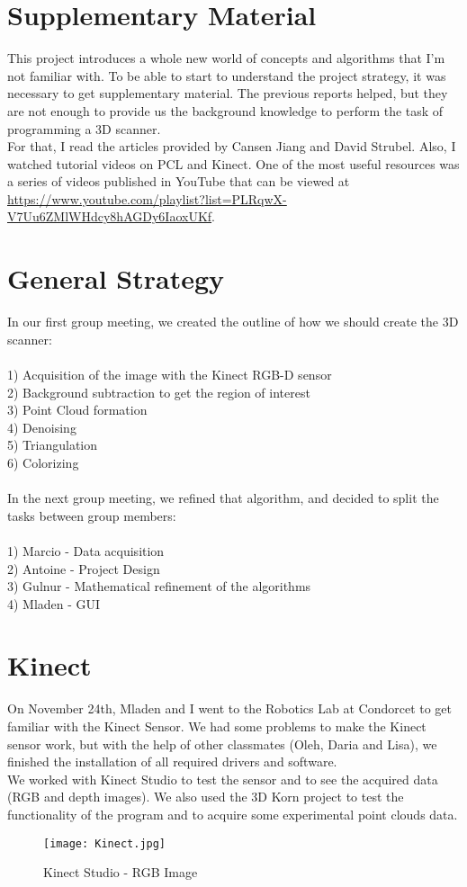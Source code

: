 \documentclass[aps,letterpaper,11pt]{revtex4}
\begin{document}
\section{Supplementary Material}
This project introduces a whole new world of concepts and algorithms that I'm not familiar with. To be able to start to understand the project strategy, it was necessary to get supplementary material. The previous reports helped, but they are not enough to provide us the background knowledge to perform the task of programming a 3D scanner.\\
\indent For that, I read the articles provided by Cansen Jiang and David Strubel. Also, I watched tutorial videos on PCL and Kinect. One of the most useful resources was a series of videos published in YouTube that can be viewed at \url{https://www.youtube.com/playlist?list=PLRqwX-V7Uu6ZMlWHdcy8hAGDy6IaoxUKf}.
\section{General Strategy}
In our first group meeting, we created the outline of how we should create the 3D scanner:\\
\\
1) Acquisition of the image with the Kinect RGB-D sensor\\
2) Background subtraction to get the region of interest\\
3) Point Cloud formation\\
4) Denoising\\
5) Triangulation\\
6) Colorizing\\
\\
\indent In the next group meeting, we refined that algorithm, and decided to split the tasks between group members:\\
\\
1) Marcio - Data acquisition\\
2) Antoine - Project Design\\
3) Gulnur - Mathematical refinement of the algorithms\\
4) Mladen - GUI\\
\section{Kinect}
On November 24th, Mladen and I went to the Robotics Lab at Condorcet to get familiar with the Kinect Sensor. We had some problems to make the Kinect sensor work, but with the help of other classmates (Oleh, Daria and Lisa), we finished the installation of all required drivers and software.\\
\indent We worked with Kinect Studio to test the sensor and to see the acquired data (RGB and depth images). We also used the 3D Korn project to test the functionality of the program and to acquire some experimental point clouds data.\\
\begin{figure}[!htb]
\centering
\texttt{[image: Kinect.jpg]}
\caption{Kinect Studio - RGB Image}
\end{figure}
\end{document}
